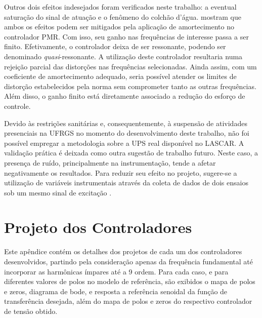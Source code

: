 \documentclass[repeatfields,oneside]{tcc}
\begin{document}
Outros dois efeitos indesejados foram verificados neste trabalho: a eventual saturação do sinal de atuação e o fenômeno do colchão d'água.
\textcite{Keiel2017, Keiel2019, Bertoldi2019} mostram que ambos os efeitos podem ser mitigados pela aplicação de amortecimento no controlador PMR.
Com isso, seu ganho nas frequências de interesse passa a ser finito.
Efetivamente, o controlador deixa de ser ressonante, podendo ser denominado \textit{quasi}-ressonante.
A utilização deste controlador resultaria numa rejeição parcial das distorções nas frequências selecionadas.
Ainda assim, com um coeficiente de amortecimento adequado, seria possível atender os limites de distorção estabelecidos pela norma \textcite{IEC62040-3:2011} sem comprometer tanto as outras frequências.
Além disso, o ganho finito está diretamente associado a redução do esforço de controle.

Devido às restrições sanitárias e, consequentemente, à suspensão de atividades presenciais na UFRGS no momento do desenvolvimento deste trabalho, não foi possível empregar a metodologia sobre a UPS real disponível no LASCAR.
A validação prática é deixada como outra sugestão de trabalho futuro.
Neste caso, a presença de ruído, principalmente na instrumentação, tende a afetar negativamente os resultados.
Para reduzir seu efeito no projeto, sugere-se a utilização de variáveis instrumentais através da coleta de dados de dois ensaios sob um mesmo sinal de excitação \cite{Campi2000}.

\appendix

\chapter{Projeto dos Controladores}\label{app:varia_polo}

Este apêndice contém os detalhes dos projetos de cada um dos controladores desenvolvidos, partindo pela consideração apenas da frequência fundamental até incorporar as harmônicas ímpares até a 9{\textordfeminine} ordem.
Para cada caso, e para diferentes valores de polos no modelo de referência, são exibidos o mapa de polos e zeros, diagrama de bode, e resposta a referência senoidal da função de transferência desejada, além do mapa de polos e zeros do respectivo controlador de tensão obtido.
\end{document}
